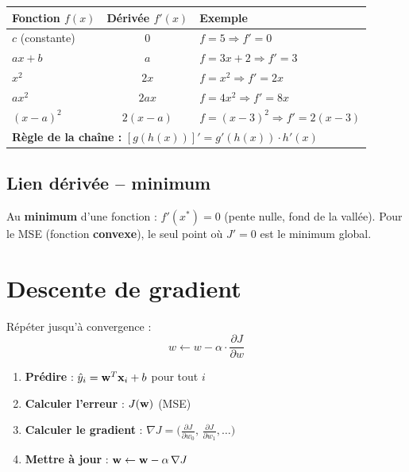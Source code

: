 \begin{center}
\renewcommand{\arraystretch}{1.35}
\begin{tabularx}{0.92\textwidth}{l c X}
    \toprule
    \textbf{Fonction} $f(x)$ & \textbf{D\'{e}riv\'{e}e} $f'(x)$ & \textbf{Exemple} \\
    \midrule
    $c$ (constante)        & $0$          & $f=5 \Rightarrow f'=0$ \\
    $ax + b$               & $a$          & $f=3x+2 \Rightarrow f'=3$ \\
    $x^2$                  & $2x$         & $f=x^2 \Rightarrow f'=2x$ \\
    $ax^2$                 & $2ax$        & $f=4x^2 \Rightarrow f'=8x$ \\
    $(x-a)^2$              & $2(x-a)$     & $f=(x{-}3)^2 \Rightarrow f'=2(x{-}3)$ \\
    \midrule
    \multicolumn{3}{l}{\textbf{R\`{e}gle de la cha\^{i}ne :}
    $[g(h(x))]' = g'(h(x)) \cdot h'(x)$} \\
    \bottomrule
\end{tabularx}
\end{center}

\subsection{Lien d\'{e}riv\'{e}e -- minimum}

\begin{retenirbox}
    Au \textbf{minimum} d'une fonction : $f'(x^*) = 0$ (pente nulle, fond de la vall\'{e}e).
    Pour le MSE (fonction \textbf{convexe}), le seul point o\`{u} $J'=0$ est le minimum global.
\end{retenirbox}

\section{Descente de gradient}

\begin{definitionbox}
    R\'{e}p\'{e}ter jusqu'\`{a} convergence :
    \begin{equation}
        \boxed{\;w \leftarrow w - \alpha \cdot \frac{\partial J}{\partial w}\;}
        \label{eq:gd}
    \end{equation}
    \begin{enumerate}
        \item \textbf{Pr\'{e}dire} : $\hat{y}_i = \mathbf{w}^T \mathbf{x}_i + b$ pour tout $i$
        \item \textbf{Calculer l'erreur} : $J(\mathbf{w})$ (MSE)
        \item \textbf{Calculer le gradient} : $\nabla J = \bigl(\frac{\partial J}{\partial w_0},\, \frac{\partial J}{\partial w_1}, \ldots\bigr)$
        \item \textbf{Mettre \`{a} jour} : $\mathbf{w} \leftarrow \mathbf{w} - \alpha \, \nabla J$
    \end{enumerate}
\end{definitionbox}

